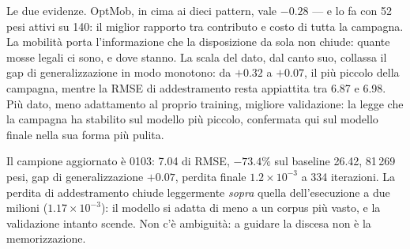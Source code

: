 Le due evidenze. OptMob, in cima ai dieci pattern, vale $-0.28$ —
e lo fa con 52 pesi attivi su 140: il miglior rapporto tra
contributo e costo di tutta la campagna. La mobilità porta
l'informazione che la disposizione da sola non chiude: quante mosse
legali ci sono, e dove stanno. La scala del dato, dal canto suo,
collassa il gap di generalizzazione in modo monotono: da $+0.32$ a
$+0.07$, il più piccolo della campagna, mentre la RMSE di
addestramento resta appiattita tra 6.87 e 6.98. Più dato, meno
adattamento al proprio training, migliore validazione: la legge che
la campagna ha stabilito sul modello più piccolo, confermata qui sul
modello finale nella sua forma più pulita.

Il campione aggiornato è 0103: 7.04 di RMSE, $-73.4\%$ sul baseline
26.42, 81\,269 pesi, gap di generalizzazione $+0.07$, perdita
finale $1.2\times10^{-3}$ a 334 iterazioni. La perdita di
addestramento chiude leggermente \emph{sopra} quella dell'esecuzione
a due milioni ($1.17\times10^{-3}$): il modello si adatta di meno a
un
corpus più vasto, e la validazione intanto scende. Non c'è
ambiguità: a guidare la discesa non è la memorizzazione.
